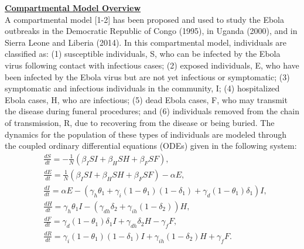 \documentclass[11pt,letter]{article}
\begin{document}
\underline{\textbf{Compartmental Model Overview}}\vspace{0.5mm}\\
A compartmental model [1-2] has been proposed and used to study the Ebola outbreaks in the Democratic Republic of Congo (1995), in Uganda (2000), and in Sierra Leone and Liberia (2014). In this compartmental model, individuals are classified as: (1) susceptible individuals, S, who can be infected by the Ebola virus following contact with infectious cases; (2) exposed individuals, E, who have been infected by the Ebola virus but are not yet infectious or symptomatic; (3) symptomatic and infectious individuals in the community, I; (4) hospitalized Ebola cases, H, who are infectious; (5) dead Ebola cases, F, who may transmit the disease during funeral procedures; and (6) individuals removed from the chain of transmission, R, due to recovering from the disease or being buried. The dynamics for the population of these types of individuals are modeled through the coupled ordinary differential equations (ODEs) given in the following system:
\begin{subequations}
	\begin{align}
		&\frac{dS}{dt}=-\frac{1}{N}\left(\beta_ISI+\beta_HSH+\beta_FSF\right),\\
		&\frac{dE}{dt}=\frac{1}{N}\left(\beta_ISI+\beta_HSH+\beta_FSF\right)-\alpha E,\\
		&\frac{dI}{dt}=\alpha E-\left(\gamma_h\theta_1+\gamma_i(1-\theta_1)(1-\delta_1)+\gamma_d(1-\theta_1)\delta_1\right)I,\\
		&\frac{dH}{dt}=\gamma_h\theta_1I-\left(\gamma_{dh}\delta_2+\gamma_{ih}(1-\delta_2)\right)H,\\
		&\frac{dF}{dt}=\gamma_d(1-\theta_1)\delta_1I+\gamma_{dh}\delta_2H-\gamma_fF,\\
		&\frac{dR}{dt}=\gamma_i(1-\theta_1)(1-\delta_1)I+\gamma_{ih}(1-\delta_2)H+\gamma_fF.
	\end{align}
	\label{eq:ODEs}
\end{subequations}
\end{document}
